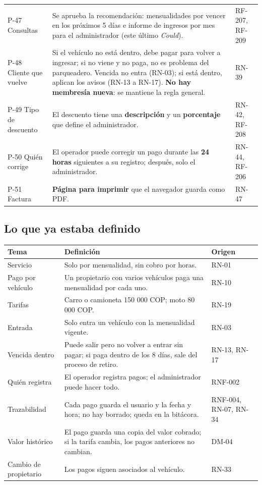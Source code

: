 \begin{longtable}{>{\raggedright\arraybackslash}p{2.4000000000000004cm}>{\raggedright\arraybackslash}p{10.5cm}>{\raggedright\arraybackslash}p{1.5cm}}
P-47 Consultas & Se aprueba la recomendación: mensualidades por vencer en los próximos 5 días e informe de ingresos por mes para el administrador (este último \emph{Could}). & RF-207, RF-209\\
P-48 Cliente que vuelve & Si el vehículo no está dentro, debe pagar para volver a ingresar; si no viene y no paga, no es problema del parqueadero. Vencida no entra (RN-03); si está dentro, aplican los avisos (RN-13 a RN-17). \textbf{No hay membresía nueva}: se mantiene la regla general. & RN-39\\
P-49 Tipo de descuento & El descuento tiene una \textbf{descripción} y un \textbf{porcentaje} que define el administrador. & RN-42, RF-208\\
P-50 Quién corrige & El operador puede corregir un pago durante las \textbf{24 horas} siguientes a su registro; después, solo el administrador. & RN-44, RF-206\\
P-51 Factura & \textbf{Página para imprimir} que el navegador guarda como PDF. & RN-47\\
\bottomrule
\end{longtable}




\subsection{Lo que ya estaba definido}

\begin{longtable}{>{\raggedright\arraybackslash}p{2.4000000000000004cm}>{\raggedright\arraybackslash}p{10.4cm}>{\raggedright\arraybackslash}p{1.6cm}}
\toprule
\textbf{Tema} & \textbf{Definición} & \textbf{Origen}\\
\midrule\endhead
Servicio & Solo por mensualidad, sin cobro por horas. & RN-01\\
Pago por vehículo & Un propietario con varios vehículos paga una mensualidad por cada uno. & RN-10\\
Tarifas & Carro o camioneta 150 000 COP; moto 80 000 COP. & RN-19\\
Entrada & Solo entra un vehículo con la mensualidad vigente. & RN-03\\
Vencida dentro & Puede salir pero no volver a entrar sin pagar; si paga dentro de los 8 días, sale del proceso de retiro. & RN-13, RN-17\\
Quién registra & El operador registra pagos; el administrador puede hacer todo. & RNF-002\\
Trazabilidad & Cada pago guarda el usuario y la fecha y hora; no hay borrado; queda en la bitácora. & RNF-004, RN-07, RN-34\\
Valor histórico & El pago guarda una copia del valor cobrado; si la tarifa cambia, los pagos anteriores no cambian. & DM-04\\
Cambio de propietario & Los pagos siguen asociados al vehículo. & RN-33\\
\bottomrule
\end{longtable}




